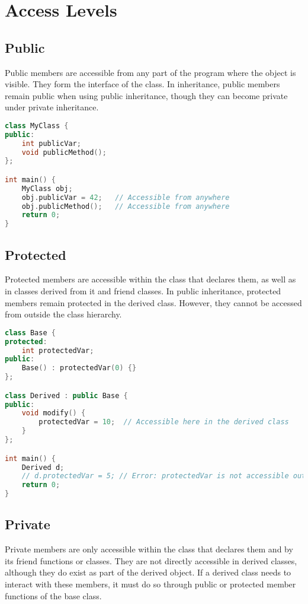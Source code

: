 \section{Access Levels}

\subsection{Public}
Public members are accessible from any part of the program
where the object is visible. They form the interface of the
class. In inheritance, public members remain public when using
public inheritance, though they can become private under private
inheritance.

\begin{lstlisting}[language=C++]
class MyClass {
public:
    int publicVar;
    void publicMethod();
};

int main() {
    MyClass obj;
    obj.publicVar = 42;   // Accessible from anywhere
    obj.publicMethod();   // Accessible from anywhere
    return 0;
}
\end{lstlisting}

\subsection{Protected}
Protected members are accessible within the class that declares
them, as well as in classes derived from it and friend classes.
In public inheritance, protected members remain protected in the
derived class. However, they cannot be accessed from outside the
class hierarchy.

\begin{lstlisting}[language=C++]
class Base {
protected:
    int protectedVar;
public:
    Base() : protectedVar(0) {}
};

class Derived : public Base {
public:
    void modify() {
        protectedVar = 10;  // Accessible here in the derived class
    }
};

int main() {
    Derived d;
    // d.protectedVar = 5; // Error: protectedVar is not accessible outside Base or Derived
    return 0;
}
\end{lstlisting}

\subsection{Private}
Private members are only accessible within the class that declares
them and by its friend functions or classes. They are not directly
accessible in derived classes, although they do exist as part of the
derived object. If a derived class needs to interact with these members,
it must do so through public or protected member functions of the base class.

